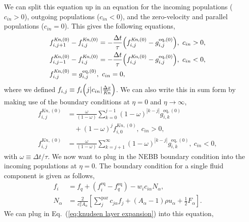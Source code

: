 \documentclass[aps,physrev,twocolumn,10pt]{revtex4-2}
\begin{document}
We can split this equation up in an equation for the incoming populations ($c_{in} > 0$), outgoing populations ($c_{in} < 0$), and the zero-velocity and parallel populations ($c_{in} = 0$). This gives the following equations,
\begin{equation}
\begin{split}
    &f_{i,j+1}^{\textit{Kn},(0)} - f_{i,j}^{\textit{Kn},(0)} =-\frac{\Delta t}{\tau}\Bigl(f_{i,j}^{\textit{Kn},(0)}  - g_{i,j}^{\text{eq},(0)}\Bigr),\ c_{in} > 0,\\
    &f_{i,j-1}^{\textit{Kn},(0)} - f_{i,j}^{\textit{Kn},(0)} =-\frac{\Delta t}{\tau}\Bigl(f_{i,j}^{\textit{Kn},(0)}  - g_{i,j}^{\text{eq},(0)}\Bigr),\ c_{in} < 0,\\
    &f_{i,j}^{\textit{Kn},(0)} = g_{i,j}^{\text{eq},(0)},\ c_{in} = 0,
\end{split}
\end{equation}
where we defined $f_{i,j} \equiv f_i\Bigl(j|c_{in}|\frac{\Delta x}{\textit{Kn}}\Bigr)$. We can also write this in sum form by making use of the boundary conditions at $\eta = 0$ and $\eta \rightarrow \infty$, 
\begin{equation}
\begin{split}
    f_{i,j}^{\textit{Kn},(0)} &= \frac{\omega}{\left(1 - \omega\right)} \sum_{k=0}^{j-1} \left(1 - \omega\right)^{|k-j|}g_{i,k}^{\text{eq},(0)}\\
    &\quad + \left(1 - \omega\right)^j f_{i,0}^{\textit{Kn},(0)},\ c_{in} > 0,\\
    f_{i,j}^{\textit{Kn},(0)} &=\frac{\omega}{\left(1 - \omega\right)} \sum_{k=j+1}^{\infty} \left(1 - \omega\right)^{|k-j|}g_{i,k}^{\text{eq},(0)},\ c_{in} < 0,
\end{split}
\end{equation}
with $\omega \equiv \Delta t / \tau$. We now want to plug in the NEBB boundary condition into the incoming populations at $\eta = 0$. The boundary condition for a single fluid component is given as follows,
\begin{equation}
\begin{split}
    f_i &= f_q + \left(f_i^\text{eq} - f_q^\text{eq}\right) - w_i c_{i\alpha}N_\alpha,\\
    N_\alpha &= \frac{2}{c_s^2 A_\alpha} \left[\sum_j^\text{par} c_{j\alpha}f_j + \left(A_\alpha - 1\right)\rho u_\alpha + \frac{1}{2}F_\alpha\right].
\end{split}
\end{equation}
We can plug in Eq.~(\ref{eq:knudsen layer expansion}) into this equation,
\end{document}
